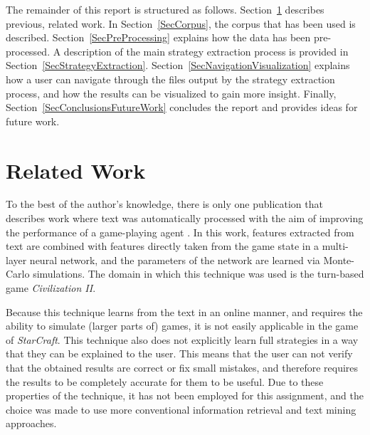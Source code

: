 \documentclass[]{article}
\newcommand{\refsection}[1]{Section~\ref{#1}}
\begin{document}
The remainder of this report is structured as follows. \refsection{SecRelatedWork} describes previous, related work. In \refsection{SecCorpus}, the corpus that has been used is described. \refsection{SecPreProcessing} explains how the data has been pre-processed. A description of the main strategy extraction process is provided in \refsection{SecStrategyExtraction}. \refsection{SecNavigationVisualization} explains how a user can navigate through the files output by the strategy extraction process, and how the results can be visualized to gain more insight. Finally, \refsection{SecConclusionsFutureWork} concludes the report and provides ideas for future work.

\section{Related Work} \label{SecRelatedWork}
To the best of the author's knowledge, there is only one publication that describes work where text was automatically processed with the aim of improving the performance of a game-playing agent \cite{Civ2011}. In this work, features extracted from text are combined with features directly taken from the game state in a multi-layer neural network, and the parameters of the network are learned via Monte-Carlo simulations. The domain in which this technique was used is the turn-based game \emph{Civilization II}. 

Because this technique learns from the text in an online manner, and requires the ability to simulate (larger parts of) games, it is not easily applicable in the game of \emph{StarCraft}. This technique also does not explicitly learn full strategies in a way that they can be explained to the user. This means that the user can not verify that the obtained results are correct or fix small mistakes, and therefore requires the results to be completely accurate for them to be useful. Due to these properties of the technique, it has not been employed for this assignment, and the choice was made to use more conventional information retrieval and text mining approaches.

\end{document}
